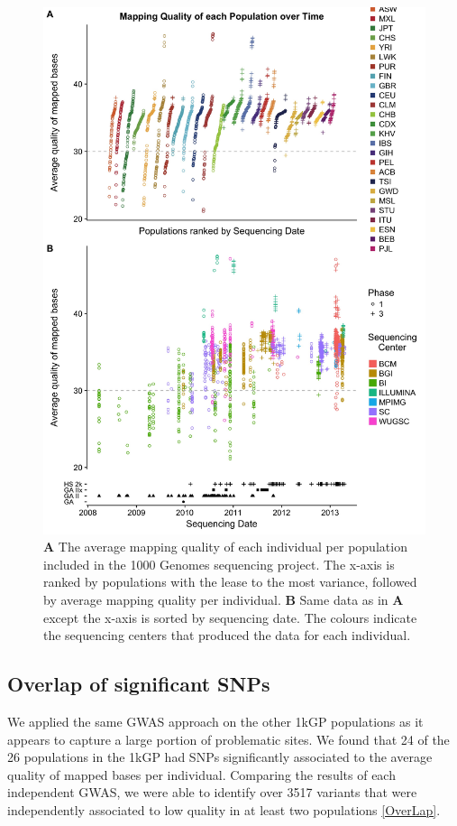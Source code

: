 \documentclass[9pt,lineno]{elife}
\begin{document}
\begin{figure}
\includegraphics[width=\hsize,keepaspectratio]{MapQualOverTime.jpg}

\caption{\textbf{A} The average mapping quality of each individual per population included in the 1000 Genomes sequencing project. The x-axis is ranked by populations with the lease to the most variance, followed by average mapping quality per individual. \textbf{B} Same data as in \textbf{A} except the x-axis is sorted by sequencing date. The colours indicate the sequencing centers that produced the data for each individual.}
\label{MapQual}
\end{figure}

	\subsection{Overlap of significant SNPs}
We applied the same GWAS approach on the other 1kGP populations as it appears to capture a large portion of problematic sites. 
We found that 24 of the 26 populations in the 1kGP had SNPs significantly associated to the average quality of mapped bases per individual.
Comparing the results of each independent GWAS, we were able to identify over 3517 variants that were independently associated to low quality in at least two populations  \ref{OverLap}. 
\end{document}
